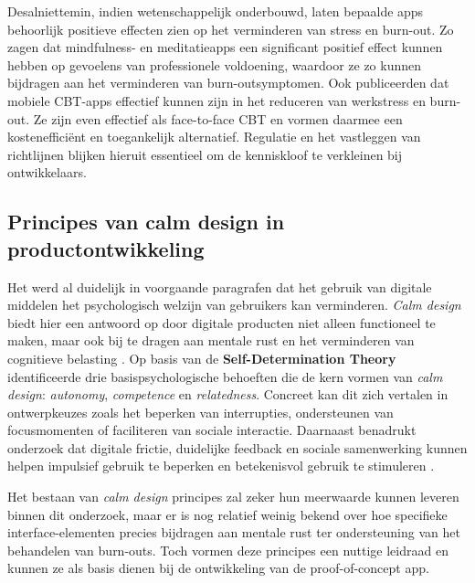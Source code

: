 \vspace{1em}

Desalniettemin, indien wetenschappelijk onderbouwd, laten bepaalde apps behoorlijk positieve effecten zien op het verminderen van stress en burn-out. Zo zagen \textcite{Deriglazov2025} dat mindfulness- en meditatieapps een significant positief effect kunnen hebben op gevoelens van professionele voldoening, waardoor ze zo kunnen bijdragen aan het verminderen van burn-outsymptomen. Ook \textcite{wojtyna2023mobile} publiceerden dat mobiele CBT-apps effectief kunnen zijn in het reduceren van werkstress en burn-out. Ze zijn even effectief als face-to-face CBT en vormen daarmee een kostenefficiënt en toegankelijk alternatief. Regulatie en het vastleggen van richtlijnen blijken hieruit essentieel om de kenniskloof te verkleinen bij ontwikkelaars.

\vspace{1em}

\subsection{Principes van calm design in \newline productontwikkeling}%
\label{subsec:calm_design_principes}

\vspace{1em}

Het werd al duidelijk in voorgaande paragrafen dat het gebruik van digitale middelen het psychologisch welzijn van gebruikers kan verminderen. \emph{Calm design} biedt hier een antwoord op door digitale producten niet alleen functioneel te maken, maar ook bij te dragen aan mentale rust en het verminderen van cognitieve belasting \autocite{Peters2022}. Op basis van de \textbf{Self-Determination Theory} identificeerde \textcite{Peters2022} drie basispsychologische behoeften die de kern vormen van \emph{calm design}: \emph{autonomy}, \emph{competence} en \emph{relatedness}. Concreet kan dit zich vertalen in ontwerpkeuzes zoals het beperken van interrupties, ondersteunen van focusmomenten of faciliteren van sociale interactie. Daarnaast benadrukt onderzoek dat digitale frictie, duidelijke feedback en sociale samenwerking kunnen helpen impulsief gebruik te beperken en betekenisvol gebruik te stimuleren \autocite{Almoallim2022}. 

\vspace{1em}

Het bestaan van \emph{calm design} principes zal zeker hun meerwaarde kunnen leveren binnen dit onderzoek, maar er is nog relatief weinig bekend over hoe specifieke interface-elementen precies bijdragen aan mentale rust ter ondersteuning van het behandelen van burn-outs. Toch vormen deze principes een nuttige leidraad en kunnen ze als basis dienen bij de ontwikkeling van de proof-of-concept app.


